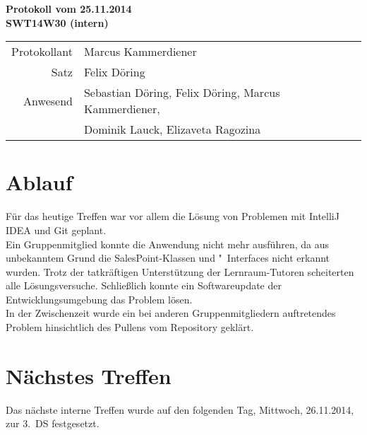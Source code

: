 \documentclass{scrartcl}
\begin{document}
\begin{center}
\LARGE \bf{Protokoll vom 25.11.2014 \\
SWT14W30 (intern)}
\end{center}

\begin{tabular}{rp{10cm}}
Protokollant & Marcus Kammerdiener \\
Satz & Felix Döring \\
Anwesend & Sebastian Döring, Felix Döring, Marcus Kammerdiener,\\
& Dominik Lauck, Elizaveta Ragozina \\
\end{tabular}

\vspace*{3em}

\section{Ablauf}
Für das heutige Treffen war vor allem die Lösung von Problemen mit IntelliJ IDEA und Git geplant. \\
Ein Gruppenmitglied konnte die Anwendung nicht mehr ausführen, da aus unbekanntem Grund die SalesPoint-Klassen und "~Interfaces nicht erkannt wurden.
Trotz der tatkräftigen Unterstützung der Lernraum-Tutoren scheiterten alle Lösungsversuche.
Schließlich konnte ein Softwareupdate der Entwicklungsumgebung das Problem lösen. \\
In der Zwischenzeit wurde ein bei anderen Gruppenmitgliedern auftretendes Problem hinsichtlich des Pullens vom Repository geklärt.
\section{N\"achstes Treffen}
Das nächste interne Treffen wurde auf den folgenden Tag, Mittwoch, 26.11.2014, zur 3.~DS festgesetzt.
\end{document}
